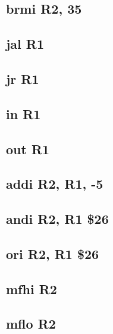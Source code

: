 \documentclass{article}
\begin{document}
    \subsection{brmi R2, 35} \label{brmi_sequence}
        
    \subsection{jal R1} \label{jal_sequence}
        
    \subsection{jr R1} \label{jr_sequence}
        
    \subsection{in R1} \label{in_sequence}
        
    \subsection{out R1} \label{out_sequence}
        
    \subsection{addi R2, R1, -5} \label{addi_sequence}
        
    \subsection{andi R2, R1 \$26} \label{andi_sequence}
        
    \subsection{ori R2, R1 \$26} \label{ori_sequence}
        
    \subsection{mfhi R2} \label{mfhi_sequence}
        
    \subsection{mflo R2} \label{mflo_sequence}
        
\end{document}
